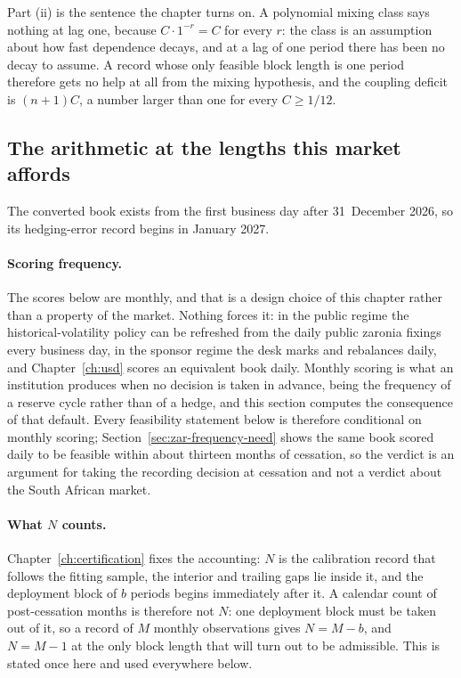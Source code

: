 \documentclass[../../../main.tex]{subfiles}
\begin{document}
Part (ii) is the sentence the chapter turns on. A polynomial mixing class says nothing at lag one, because $C\cdot1^{-r}=C$ for every $r$: the class is an assumption about how fast dependence decays, and at a lag of one period there has been no decay to assume. A record whose only feasible block length is one period therefore gets no help at all from the mixing hypothesis, and the coupling deficit is $(n+1)C$, a number larger than one for every $C\ge1/12$.

\subsection{The arithmetic at the lengths this market affords}

The converted book exists from the first business day after 31~December 2026, so its hedging-error record begins in January 2027.

\paragraph{Scoring frequency.} The scores below are monthly, and that is a design choice of this chapter rather than a property of the market. Nothing forces it: in the public regime the historical-volatility policy can be refreshed from the daily public \gls{zaronia} fixings every business day, in the sponsor regime the desk marks and rebalances daily, and Chapter~\ref{ch:usd} scores an equivalent book daily. Monthly scoring is what an institution produces when no decision is taken in advance, being the frequency of a reserve cycle rather than of a hedge, and this section computes the consequence of that default. Every feasibility statement below is therefore conditional on monthly scoring; Section~\ref{sec:zar-frequency-need} shows the same book scored daily to be feasible within about thirteen months of cessation, so the verdict is an argument for taking the recording decision at cessation and not a verdict about the South African market.

\paragraph{What $N$ counts.} Chapter~\ref{ch:certification} fixes the accounting: $N$ is the calibration record that follows the fitting sample, the interior and trailing gaps lie inside it, and the deployment block of $b$ periods begins immediately after it. A calendar count of post-cessation months is therefore not $N$: one deployment block must be taken out of it, so a record of $M$ monthly observations gives $N=M-b$, and $N=M-1$ at the only block length that will turn out to be admissible. This is stated once here and used everywhere below.
\end{document}
